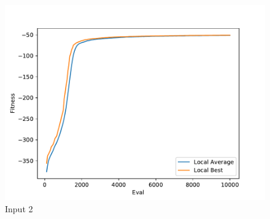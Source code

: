 \documentclass{standalone}
\begin{document}
\begin{figure}[!htb]
	\caption{Input 2}
	\label{fig:graph_2034}
	\includegraphics[width=\textwidth]{../graphs/graphs/2034.pdf}
\end{figure}
\end{document}
